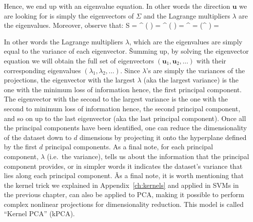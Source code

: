 \vspace{-15pt}

Hence, we end up with an eigenvalue equation. In other words the direction $\boldsymbol{u}$ we are looking for is
simply the eigenvectors of $\Sigma$ and the Lagrange multipliers $\lambda$ are the eigenvalues. Moreover, observe that:
\bse
S = ^{\intercal} \left( \Sigma {} \right) =
^{\intercal} \left( \lambda {} \right) = 
^{\intercal} \lambda {} = 
\lambda \left(^{\intercal}  \right) = \lambda
\ese

In other words the Lagrange multipliers $\lambda$, which are the eigenvalues are simply equal to the variance of 
each eigenvector. \v

Summing up, by solving the eigenvector equation we will obtain the full set of eigenvectors $(\boldsymbol{u}_1, 
\boldsymbol{u}_2, \ldots)$ with their corresponding eigenvalues $(\lambda_1, \lambda_2, \ldots)$. Since $\lambda$'s 
are simply the variances of the projections, the eigenvector with the largest $\lambda$ (aka the largest variance) is
the one with the minimum loss of information hence, the first principal component. The eigenvector with the second to
the largest variance is the one with the second to minimum loss of information hence, the second principal component,
and so on up to the last eigenvector (aka the last principal component). Once all the principal components have been 
identified, one can reduce the dimensionality of the dataset down to $d$ dimensions by projecting it onto the 
hyperplane defined by the first $d$ principal components. As a final note, for each principal component, $\lambda$
(i.e.\ the variance), tells us about the information that the principal component provides, or in simpler words it
indicates the dataset's variance that lies along each principal component. \v

As a final note, it is worth mentioning that the kernel trick we explained in Appendix~\ref{ch:kernels} and applied 
in SVMs in the previous chapter, can also be applied to PCA, making it possible to perform complex nonlinear 
projections for dimensionality reduction. This model is called ``Kernel PCA'' (kPCA).

